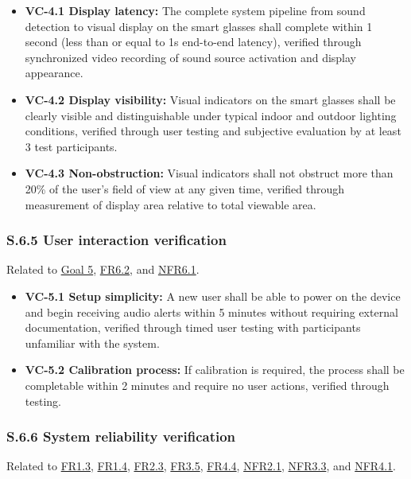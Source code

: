 \documentclass[12pt]{article}
\theoremstyle{definition}
\begin{document}
\begin{itemize}
\item \textbf{VC-4.1 Display latency:} The complete system pipeline from sound
detection to visual display on the smart glasses shall complete within 1 second
(less than or equal to 1s end-to-end latency), verified through synchronized
video recording of sound source activation and display appearance.

\item \textbf{VC-4.2 Display visibility:} Visual indicators on the smart glasses
shall be clearly visible and distinguishable under typical indoor and outdoor
lighting conditions, verified through user testing and subjective evaluation by
at least 3 test participants.

\item \textbf{VC-4.3 Non-obstruction:} Visual indicators shall not obstruct more
than 20\% of the user's field of view at any given time, verified through
measurement of display area relative to total viewable area.
\end{itemize}

\subsubsection{S.6.5 User interaction verification}

Related to \hyperref[goal:user_friendly_interaction]{Goal 5},
\hyperref[FR6_2]{FR6.2}, and \hyperref[NFR6_1]{NFR6.1}.

\begin{itemize}
\item \textbf{VC-5.1 Setup simplicity:} A new user shall be able to power on the
device and begin receiving audio alerts within 5 minutes without requiring
external documentation, verified through timed user testing with participants
unfamiliar with the system.

\item \textbf{VC-5.2 Calibration process:} If calibration is required, the
process shall be completable within 2 minutes and require no user actions,
verified through testing.
\end{itemize}

\subsubsection{S.6.6 System reliability verification}

Related to \hyperref[FR1_3]{FR1.3}, \hyperref[FR1_4]{FR1.4},
\hyperref[FR2_3]{FR2.3}, \hyperref[FR3_5]{FR3.5}, \hyperref[FR4_4]{FR4.4},
\hyperref[NFR2_1]{NFR2.1}, \hyperref[NFR3_3]{NFR3.3}, and
\hyperref[NFR4_1]{NFR4.1}.
\end{document}
